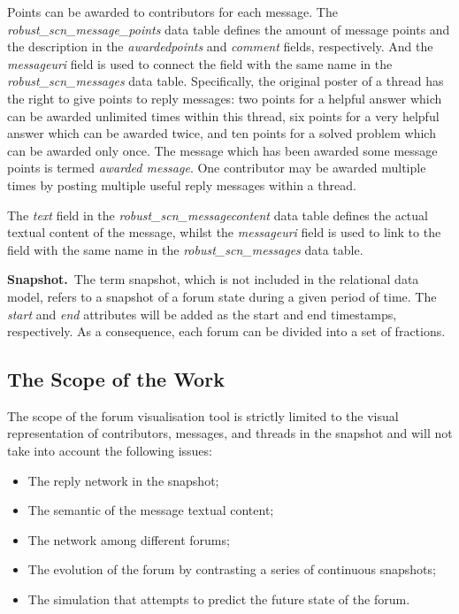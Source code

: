 Points can be awarded to contributors for each message. The \emph{robust\_scn\_message\_points} data table defines the amount of message points and the description in the \emph{awardedpoints} and \emph{comment} fields, respectively. And the \emph{messageuri} field is used to connect the field with the same name in the \emph{robust\_scn\_messages} data table. Specifically, the original poster of a thread has the right to give points to reply messages: two points for a helpful answer which can be awarded unlimited times within this thread, six points for a very helpful answer which can be awarded twice, and ten points for a solved problem which can be awarded only once. The message which has been awarded some message points is termed \emph{awarded message}. One contributor may be awarded multiple times by posting multiple useful reply messages within a thread.

The \emph{text} field in the \emph{robust\_scn\_messagecontent} data table defines the actual textual content of the message, whilst the \emph{messageuri} field is used to link to the field with the same name in the \emph{robust\_scn\_messages} data table.

\textbf{Snapshot.}~The term snapshot, which is not included in the relational data model, refers to a snapshot of a forum state during a given period of time. The \emph{start} and \emph{end} attributes will be added as the start and end timestamps, respectively. As a consequence, each forum can be divided into a set of fractions.

\subsection{The Scope of the Work} \label{sec:scope}
The scope of the forum visualisation tool is strictly limited to the visual representation of contributors, messages, and threads in the snapshot and will not take into account the following issues:
\begin{itemize}
  \item The reply network in the snapshot;
  \item The semantic of the message textual content;
  \item The network among different forums;
  \item The evolution of the forum by contrasting a series of continuous snapshots;
  \item The simulation that attempts to predict the future state of the forum.
\end{itemize}

